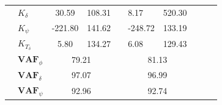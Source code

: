\begin{table}[]
\begin{tabular}{llcc|llllll}
                                                 & $K_\delta $           & 30.59                                      & 108.31                                               &                                              & 8.17                   & 520.30                          &  &  &  \\
                                                 & $K_\psi $             & -221.80                                    & 141.62                                               &                                              & -248.72                & 133.19                          &  &  &  \\
                                                 & $K_{T_\delta}$        & 5.80                                       & 134.27                                               &                                              & 6.08                   & 129.43                          &  &  &  \\ \cline{2-4} \cline{6-7}
                                                 & $\mathbf{VAF}_\phi$   & \multicolumn{2}{c|}{79.21}                                                                        &                                              & \multicolumn{2}{c}{81.13}                                &  &  &  \\
                                                 & $\mathbf{VAF}_\delta$ & \multicolumn{2}{c|}{97.07}                                                                        &                                              & \multicolumn{2}{c}{96.99}                                &  &  &  \\
                                                 & $\mathbf{VAF}_\psi$   & \multicolumn{2}{c|}{92.96}                                                                        &                                              & \multicolumn{2}{c}{92.74}                                &  &  & 
    \end{tabular}
    \label{tb:reduced}

    \end{table}